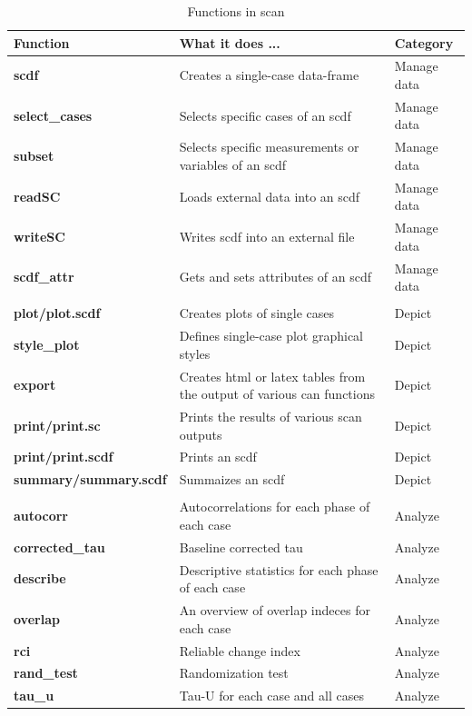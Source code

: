\documentclass[
]{book}
\begin{document}
\begin{table}

\caption{\label{tab:table-functions}Functions in scan}
\centering
\begin{tabular}[t]{>{\raggedright\arraybackslash}p{15em}>{\raggedright\arraybackslash}p{30em}l}
\toprule
Function & What it does ... & Category\\
\midrule
\textbf{scdf} & Creates a single-case data-frame & Manage data\\
\textbf{select\_cases} & Selects specific cases of an scdf & Manage data\\
\textbf{subset} & Selects specific measurements or variables of an scdf & Manage data\\
\textbf{readSC} & Loads external data into an scdf & Manage data\\
\textbf{writeSC} & Writes scdf into an external file & Manage data\\
\addlinespace
\textbf{scdf\_attr} & Gets and sets attributes of an scdf & Manage data\\
\textbf{} &  \vphantom{3} & \\
\textbf{plot/plot.scdf} & Creates plots of single cases & Depict\\
\textbf{style\_plot} & Defines single-case plot graphical styles & Depict\\
\textbf{export} & Creates html or latex tables from the output of various can functions & Depict\\
\addlinespace
\textbf{print/print.sc} & Prints the results of various scan outputs & Depict\\
\textbf{print/print.scdf} & Prints an scdf & Depict\\
\textbf{summary/summary.scdf} & Summaizes an scdf & Depict\\
\textbf{} &  \vphantom{2} & \\
\textbf{autocorr} & Autocorrelations for each phase of each case & Analyze\\
\addlinespace
\textbf{corrected\_tau} & Baseline corrected tau & Analyze\\
\textbf{describe} & Descriptive statistics for each phase of each case & Analyze\\
\textbf{overlap} & An overview of overlap indeces for each case & Analyze\\
\textbf{rci} & Reliable change index & Analyze\\
\textbf{rand\_test} & Randomization test & Analyze\\
\addlinespace
\textbf{tau\_u} & Tau-U for each case and all cases & Analyze\\

\end{tabular}
\end{table}
\end{document}
